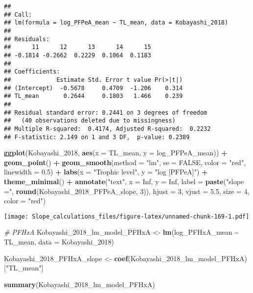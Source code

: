 \documentclass[
]{article}
\newenvironment{Shaded}{\begin{snugshade}}{\end{snugshade}}
\newcommand{\AttributeTok}[1]{\textcolor[rgb]{0.13,0.29,0.53}{#1}}
\newcommand{\CommentTok}[1]{\textcolor[rgb]{0.56,0.35,0.01}{\textit{#1}}}
\newcommand{\ConstantTok}[1]{\textcolor[rgb]{0.56,0.35,0.01}{#1}}
\newcommand{\DecValTok}[1]{\textcolor[rgb]{0.00,0.00,0.81}{#1}}
\newcommand{\FloatTok}[1]{\textcolor[rgb]{0.00,0.00,0.81}{#1}}
\newcommand{\FunctionTok}[1]{\textcolor[rgb]{0.13,0.29,0.53}{\textbf{#1}}}
\newcommand{\NormalTok}[1]{#1}
\newcommand{\OtherTok}[1]{\textcolor[rgb]{0.56,0.35,0.01}{#1}}
\newcommand{\SpecialCharTok}[1]{\textcolor[rgb]{0.81,0.36,0.00}{\textbf{#1}}}
\newcommand{\StringTok}[1]{\textcolor[rgb]{0.31,0.60,0.02}{#1}}
\begin{document}
\begin{verbatim}
## 
## Call:
## lm(formula = log_PFPeA_mean ~ TL_mean, data = Kobayashi_2018)
## 
## Residuals:
##      11      12      13      14      15 
## -0.1814 -0.2662  0.2229  0.1064  0.1183 
## 
## Coefficients:
##             Estimate Std. Error t value Pr(>|t|)
## (Intercept)  -0.5678     0.4709  -1.206    0.314
## TL_mean       0.2644     0.1803   1.466    0.239
## 
## Residual standard error: 0.2441 on 3 degrees of freedom
##   (40 observations deleted due to missingness)
## Multiple R-squared:  0.4174, Adjusted R-squared:  0.2232 
## F-statistic: 2.149 on 1 and 3 DF,  p-value: 0.2389
\end{verbatim}

\begin{Shaded}
\begin{Highlighting}[]
\FunctionTok{ggplot}\NormalTok{(Kobayashi\_2018, }\FunctionTok{aes}\NormalTok{(}\AttributeTok{x =}\NormalTok{ TL\_mean, }\AttributeTok{y =}\NormalTok{ log\_PFPeA\_mean)) }\SpecialCharTok{+}
  \FunctionTok{geom\_point}\NormalTok{() }\SpecialCharTok{+}
  \FunctionTok{geom\_smooth}\NormalTok{(}\AttributeTok{method =} \StringTok{"lm"}\NormalTok{, }\AttributeTok{se =} \ConstantTok{FALSE}\NormalTok{, }\AttributeTok{color =} \StringTok{"red"}\NormalTok{, }\AttributeTok{linewidth =} \FloatTok{0.5}\NormalTok{) }\SpecialCharTok{+}
  \FunctionTok{labs}\NormalTok{(}\AttributeTok{x =} \StringTok{"Trophic level"}\NormalTok{,}
       \AttributeTok{y =} \StringTok{"log [PFPeA]"}\NormalTok{) }\SpecialCharTok{+}
  \FunctionTok{theme\_minimal}\NormalTok{() }\SpecialCharTok{+}
  \FunctionTok{annotate}\NormalTok{(}\StringTok{"text"}\NormalTok{, }\AttributeTok{x =} \ConstantTok{Inf}\NormalTok{, }\AttributeTok{y =} \ConstantTok{Inf}\NormalTok{, }\AttributeTok{label =} \FunctionTok{paste}\NormalTok{(}\StringTok{"slope ="}\NormalTok{, }\FunctionTok{round}\NormalTok{(Kobayashi\_2018\_PFPeA\_slope, }\DecValTok{3}\NormalTok{)), }
           \AttributeTok{hjust =} \DecValTok{3}\NormalTok{, }\AttributeTok{vjust =} \FloatTok{5.5}\NormalTok{, }\AttributeTok{size =} \DecValTok{4}\NormalTok{, }\AttributeTok{color =} \StringTok{"red"}\NormalTok{)}
\end{Highlighting}
\end{Shaded}

\texttt{[image: Slope\_calculations\_files/figure-latex/unnamed-chunk-169-1.pdf]}

\begin{Shaded}
\begin{Highlighting}[]
\CommentTok{\# PFHxA}
\NormalTok{Kobayashi\_2018\_lm\_model\_PFHxA }\OtherTok{\textless{}{-}} \FunctionTok{lm}\NormalTok{(log\_PFHxA\_mean }\SpecialCharTok{\textasciitilde{}}\NormalTok{ TL\_mean,}
                                    \AttributeTok{data =}\NormalTok{ Kobayashi\_2018)}

\NormalTok{Kobayashi\_2018\_PFHxA\_slope }\OtherTok{\textless{}{-}} \FunctionTok{coef}\NormalTok{(Kobayashi\_2018\_lm\_model\_PFHxA)[}\StringTok{"TL\_mean"}\NormalTok{]}

\FunctionTok{summary}\NormalTok{(Kobayashi\_2018\_lm\_model\_PFHxA)}
\end{Highlighting}
\end{Shaded}
\end{document}
